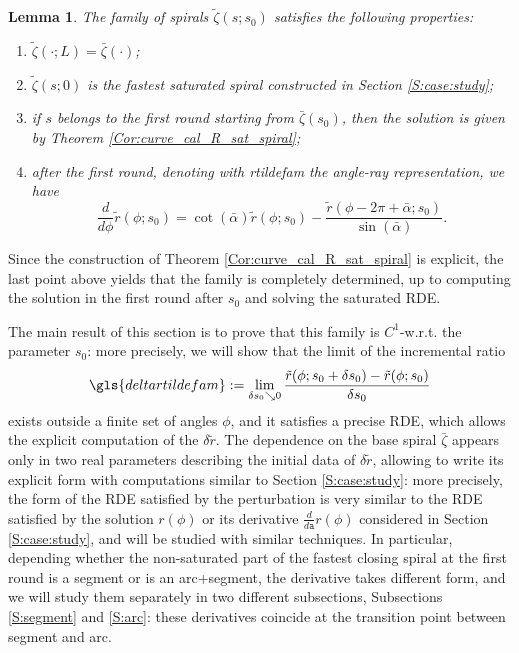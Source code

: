 \documentclass[reqno]{amsart}
\theoremstyle{definition} \newtheorem{definition}{Definition}[section]
\theoremstyle{definition} \newtheorem{remark}[definition]{Remark}
\theoremstyle{plain} \newtheorem{lemma}[definition]{Lemma}
\theoremstyle{plain} \newtheorem{proposition}[definition]{Proposition}
\theoremstyle{plain} \newtheorem{theorem}[definition]{Theorem}
\theoremstyle{plain} \newtheorem{corollary}[definition]{Corollary}
\theoremstyle{definition} \newtheorem{example}[definition]{Example}
\theoremstyle{plain} \newtheorem{claim}[clai]{Claim}
\theoremstyle{definition} \newtheorem{assumption}[definition]{Assumption}
\theoremstyle{definition} \newtheorem{observation}[definition]{Observation}
\newcommand{\1}{\mathbbm 1}
\numberwithin{equation}{section} %
\theoremstyle{plain} \newtheorem*{theorem*}{Theorem}
\theoremstyle{plain} \newtheorem{mthm}[maintheorem]{Main Theorem}
\theoremstyle{plain} \newtheorem*{mthm*}{Main Theorem}
\theoremstyle{plain} \newtheorem*{conjecture*}{Conjecture}
\theoremstyle{plain} \newtheorem{conjecture}[definition]{Conjecture}
\theoremstyle{plain} \newtheorem*{problem*}{Problem}
\begin{document}
\begin{lemma}
\label{Lem:tilde_zeta_prop}
The family of spirals $\tilde \zeta(s;s_0)$ satisfies the following properties:
\begin{enumerate}
\item $\tilde \zeta(\cdot;L) = \bar \zeta(\cdot)$;
\item $\tilde \zeta(s;0)$ is the fastest saturated spiral constructed in Section \ref{S:case:study};
\item if $s$ belongs to the first round starting from $\bar \zeta(s_0)$, then the solution is given by Theorem \ref{Cor:curve_cal_R_sat_spiral};
\item after the first round, denoting with  \gls{rtildefam} the angle-ray representation, we have
\begin{equation*}
\frac{d}{d\phi} \tilde r(\phi;s_0) = \cot(\bar \alpha) \tilde r(\phi;s_0) - \frac{\tilde r(\phi - 2\pi + \bar \alpha;s_0)}{\sin(\bar \alpha)}.
\end{equation*}
\end{enumerate}
\end{lemma}

Since the construction of Theorem \ref{Cor:curve_cal_R_sat_spiral} is explicit, the last point above yields that the family is completely determined, up to computing the solution in the first round after $s_0$ and solving the saturated RDE.

The main result of this section is to prove that this family is $C^1$-w.r.t. the parameter $s_0$: more precisely, we will show that the limit of the incremental ratio 
\begin{equation*}
\gls{deltartildefam} := \lim_{\delta s_0 \searrow 0} \frac{\tilde r(\phi;s_0 + \delta s_0) - \tilde r(\phi;s_0)}{\delta s_0}
\end{equation*}
exists outside a finite set of angles $\phi$, and it satisfies a precise RDE, which allows the explicit computation of the $\delta \tilde r$. The dependence on the base spiral $\bar \zeta$ appears only in two real parameters describing the initial data of $\delta \tilde r$, allowing to write its explicit form with computations similar to Section \ref{S:case:study}: more precisely, the form of the RDE satisfied by the perturbation is very similar to the RDE satisfied by the solution $r(\phi)$ or its derivative $\frac{d}{d\mathtt a} r(\phi)$ considered in Section \ref{S:case:study}, and will be studied with similar techniques. In particular, depending whether the non-saturated part of the fastest closing spiral at the first round is a segment or is an arc+segment, the derivative takes different form, and we will study them separately in two different subsections, Subsections \ref{S:segment} and \ref{S:arc}: these derivatives coincide at the transition point between segment and arc.
\end{document}
